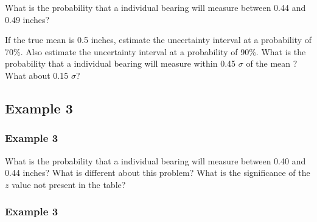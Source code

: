 \documentclass[fleqn]{beamer} %
\newcommand{\sectionIIIsubsectionIVtitle}{Example 3}
\begin{document}
			\begin{frame}

		What is the probability that a individual bearing will measure between 0.44 and 0.49 inches? 

			\end{frame}

			\begin{frame}

				If the true mean is 0.5 inches, estimate the uncertainty interval at a probability of 70\%. Also estimate the uncertainty interval at a probability of 90\%.
	What is the probability that a individual bearing will measure within 0.45 $\sigma$ of the mean ? What about 0.15 $\sigma$? \\


			\end{frame}

		\subsection{\sectionIIIsubsectionIVtitle}\label{sectionIIIsubsectionIV}	

			\begin{frame}
				\frametitle{\sectionIIIsubsectionIVtitle}

				What is the probability that a individual bearing will measure between 0.40 and 0.44 inches? What is different about this problem? What is the significance of the $z$ value not present in the table?		


			\end{frame}

			\begin{frame}
				\frametitle{\sectionIIIsubsectionIVtitle}
				


			\end{frame}
\end{document}
